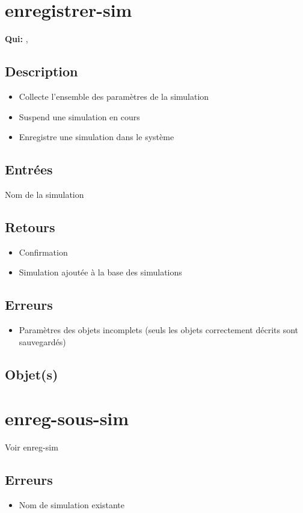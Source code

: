 \section{enregistrer-sim}
	\textbf{Qui:} \urt, \us

	\subsection{Description}
	\begin{itemize}
		\item Collecte l'ensemble des paramètres de la simulation
		\item Suspend une simulation en cours
		\item Enregistre une simulation dans le système
	\end{itemize}

	\subsection{Entrées}
		Nom de la simulation

	\subsection{Retours}
	\begin{itemize}
		\item Confirmation
		\item Simulation ajoutée à la base des simulations
	\end{itemize}

	\subsection{Erreurs}
	\begin{itemize}
		\item Paramètres des objets incomplets (seuls les objets correctement décrits sont sauvegardés)
	\end{itemize}

	\subsection{Objet(s)}
		\allobjs

\section{enreg-sous-sim}
	Voir enreg-sim

	\subsection{Erreurs}
	\begin{itemize}
		\item Nom de simulation existante \fatal
	\end{itemize}

